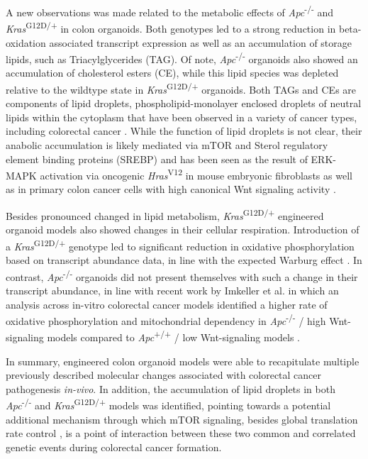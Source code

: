 \begin{flushleft}
A new observations was made related to the metabolic effects of \textit{Apc}\textsuperscript{-/-} and \textit{Kras}\textsuperscript{G12D/+} in colon organoids. Both genotypes led to a strong reduction in beta-oxidation associated transcript expression as well as an accumulation of storage lipids, such as Triacylglycerides (TAG). Of note, \textit{Apc}\textsuperscript{-/-} organoids also showed an accumulation of cholesterol esters (CE), while this lipid species was depleted relative to the wildtype state in \textit{Kras}\textsuperscript{G12D/+} organoids. Both TAGs and CEs are components of lipid droplets, phospholipid-monolayer enclosed droplets of neutral lipids within the cytoplasm that have been observed in a variety of cancer types, including colorectal cancer \parencite{cruzLipidDropletsPlatforms2020, acciolyLipidBodiesAre2008}. While the function of lipid droplets is not clear, their anabolic accumulation is likely mediated via mTOR and Sterol regulatory element binding proteins (SREBP) \parencite{cruzLipidDropletsPlatforms2020} and has been seen as the result of ERK-MAPK activation via oncogenic \textit{Hras}\textsuperscript{V12} in mouse embryonic fibroblasts \parencite{cruzCellCycleProgression2019} as well as in primary colon cancer cells with high canonical Wnt signaling activity \parencite{tirinatoLipidDropletsNew2015}.
\smallbreak

Besides pronounced changed in lipid metabolism, \textit{Kras}\textsuperscript{G12D/+} engineered organoid models also showed changes in their cellular respiration. Introduction of a \textit{Kras}\textsuperscript{G12D/+} genotype led to significant reduction in oxidative phosphorylation based on transcript abundance data, in line with the expected Warburg effect \parencite{deberardinisWeNeedTalk2020}. In contrast, \textit{Apc}\textsuperscript{-/-} organoids did not present themselves with such a change in their transcript abundance, in line with recent work by Imkeller et al. in which an analysis across in-vitro colorectal cancer models identified a higher rate of oxidative phosphorylation and mitochondrial dependency in \textit{Apc}\textsuperscript{-/-} / high Wnt-signaling models compared to \textit{Apc}\textsuperscript{+/+} / low Wnt-signaling models \parencite{imkellerMetabolicBalanceColorectal2022}. 
\smallbreak

In summary, engineered colon organoid models were able to recapitulate multiple previously described molecular changes associated with colorectal cancer pathogenesis \textit{in-vivo}. In addition, the accumulation of lipid droplets in both \textit{Apc}\textsuperscript{-/-} and \textit{Kras}\textsuperscript{G12D/+} models was identified, pointing towards a potential additional mechanism through which mTOR signaling, besides global translation rate control \parencite{smitDriverMutationsAdenomacarcinoma2020}, is a point of interaction between these two common and correlated genetic events during colorectal cancer formation. 


\end{flushleft}
